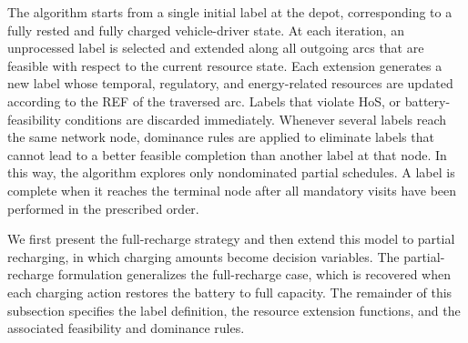 \documentclass[3p,11pt,authoryear]{elsarticle}  %
\begin{document}
The algorithm starts from a single initial label at the depot, corresponding to a fully rested and fully charged vehicle-driver state. At each iteration, an unprocessed label is selected and extended along all outgoing arcs that are feasible with respect to the current resource state. Each extension generates a new label whose temporal, regulatory, and energy-related resources are updated according to the REF of the traversed arc. Labels that violate HoS, or battery-feasibility conditions are discarded immediately. Whenever several labels reach the same network node, dominance rules are applied to eliminate labels that cannot lead to a better feasible completion than another label at that node. In this way, the algorithm explores only nondominated partial schedules. A label is complete when it reaches the terminal node after all mandatory visits have been performed in the prescribed order.

We first present the full-recharge strategy and then extend this model to partial recharging, in which charging amounts become decision variables. The partial-recharge formulation generalizes the full-recharge case, which is recovered when each charging action restores the battery to full capacity. The remainder of this subsection specifies the label definition, the resource extension functions, and the associated feasibility and dominance rules.



\end{document}
